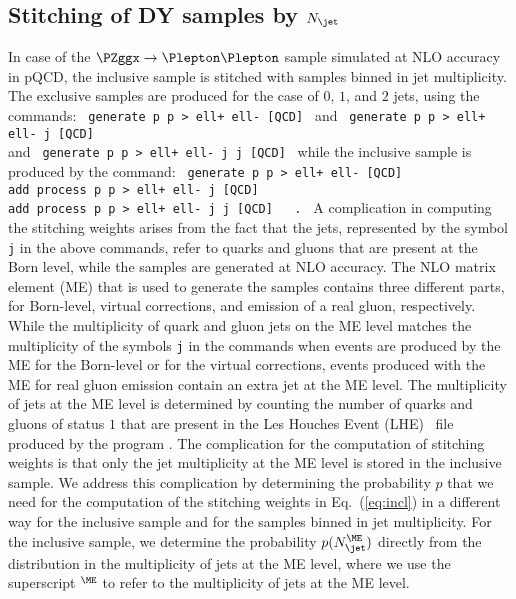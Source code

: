 \subsection{Stitching of DY samples by $N_{\jet}$}

In case of the $\PZggx \to \Plepton\Plepton$ sample simulated at NLO accuracy in pQCD,
the inclusive sample is stitched with samples binned in jet multiplicity.
The exclusive samples are produced for the case of $0$, $1$, and $2$ jets, using the \MGvATNLO commands:
\texttt{
\qquad generate p p > ell+ ell- [QCD]
}
and
\texttt{
\qquad generate p p > ell+ ell- j [QCD] \\
}
and
\texttt{
\qquad generate p p > ell+ ell- j j [QCD]
}
while the inclusive sample is produced by the command:
\texttt{
\qquad generate p p > ell+ ell- [QCD] \\
\qquad add process p p > ell+ ell- j [QCD] \\
\qquad add process p p > ell+ ell- j j [QCD] \, .
}
A complication in computing the stitching weights arises from the fact that the jets, represented by the symbol \texttt{j} in the above commands,
refer to quarks and gluons that are present at the Born level, while the samples are generated at NLO accuracy.
The NLO matrix element (ME) that is used to generate the samples contains three different parts, 
for Born-level, virtual corrections, and emission of a real gluon, respectively.
While the multiplicity of quark and gluon jets on the ME level matches the multiplicity of the symbols \texttt{j} in the \MGvATNLO commands 
when events are produced by the ME for the Born-level or for the virtual corrections,
events produced with the ME for real gluon emission contain an extra jet at the ME level.
The multiplicity of jets at the ME level is determined by counting the number of quarks and gluons of status $1$ 
that are present in the \textrm{Les Houches Event} (LHE)~\cite{Alwall:2006yp} file produced by the program \MGvATNLO.
The complication for the computation of stitching weights is that only the jet multiplicity at the ME level is stored in the inclusive sample.
We address this complication by determining the probability $p$ that we need for the computation of the stitching weights in Eq.~(\ref{eq:incl})
in a different way for the inclusive sample and for the samples binned in jet multiplicity.
For the inclusive sample, we determine the probability $p(N_{\jet}^{\ME})$ directly from the distribution in the multiplicity of jets at the ME level,
where we use the superscript $^{\ME}$ to refer to the multiplicity of jets at the ME level.
